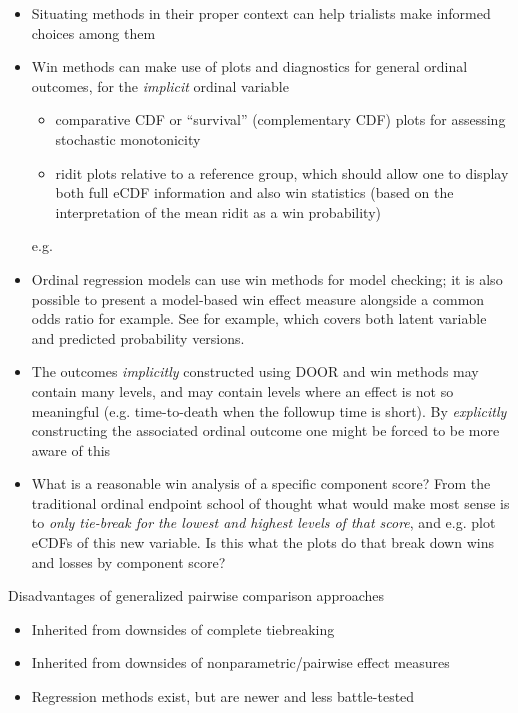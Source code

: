 \documentclass[
  11pt,
  fleqn
]{article}
\begin{document}
\begin{itemize}
  \item Situating methods in their proper context can help
    trialists make informed choices among them
  \item Win methods can make use of
    plots and diagnostics for general ordinal outcomes, for the \emph{implicit}
    ordinal variable
    \begin{itemize}
      \item comparative CDF or ``survival''
        (complementary CDF) plots for assessing stochastic
        monotonicity 
      \item ridit plots
        \citep{brossHowUseRidit1958,jansenRiditAnalysisReview1984} relative to a
        reference group, which should allow one to display both full
        eCDF information
        and also win statistics (based on the interpretation of the
          mean ridit as a win
        probability)
    \end{itemize}e.g.
  \item Ordinal regression models can use win
    methods for model checking; it is also possible to present a model-based win
    effect measure alongside a common odds ratio for example. See
    \citep{agrestiOrdinalProbabilityEffect2017} for example, which covers both
    latent variable and predicted probability versions.
  \item The outcomes
    \emph{implicitly} constructed using DOOR and win methods may contain many
    levels, and may contain levels where an effect is not so meaningful (e.g.
    time-to-death when the followup time is short). By \emph{explicitly}
    constructing the associated ordinal outcome one might be forced to be more
    aware of this
  \item What is a reasonable win analysis of a specific component
    score? From the traditional ordinal endpoint school of thought
    what would make
    most sense is to \emph{only tie-break for the lowest and highest
      levels of that
    score}, and e.g. plot eCDFs of this new variable. Is this what the plots do
    that break down wins and losses by component score?
\end{itemize}

Disadvantages of generalized pairwise comparison approaches
\begin{itemize}
  \item Inherited from downsides of complete tiebreaking
  \item Inherited from downsides of nonparametric/pairwise effect measures
  \item Regression methods exist, but are newer and less battle-tested
\end{itemize}
\end{document}

